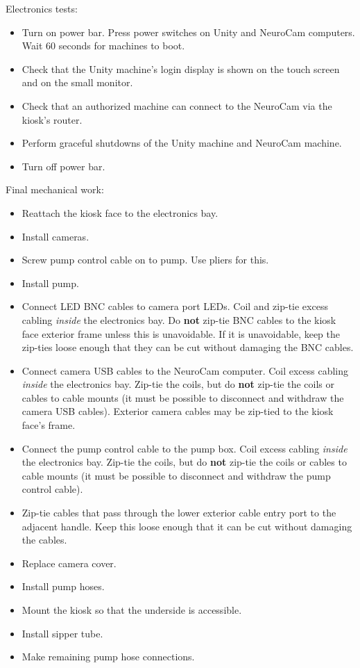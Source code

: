 Electronics tests:
\begin{itemize}
\item Turn on power bar. Press power switches on Unity and NeuroCam
computers. Wait 60 seconds for machines to boot.
\item Check that the Unity machine's login display is shown on the touch 
screen and on the small monitor.
\item Check that an authorized machine can connect to the NeuroCam via the
kiosk's router.
\item Perform graceful shutdowns of the Unity machine and NeuroCam machine.
\item Turn off power bar.
\end{itemize}

Final mechanical work:
\begin{itemize}
\item Reattach the kiosk face to the electronics bay.
\item Install cameras.
\item Screw pump control cable on to pump. Use pliers for this.
\item Install pump.
\item Connect LED BNC cables to camera port LEDs. Coil and zip-tie excess 
cabling \textit{inside} the electronics bay. Do \textbf{not} zip-tie BNC
cables to the kiosk face exterior frame unless this is unavoidable. If it
is unavoidable, keep the zip-ties loose enough that they can be cut without
damaging the BNC cables.
\item Connect camera USB cables to the NeuroCam computer. Coil excess
cabling \textit{inside} the electronics bay. Zip-tie the coils, but do
\textbf{not} zip-tie the coils or cables to cable mounts (it must be possible
to disconnect and withdraw the camera USB cables). Exterior camera cables
may be zip-tied to the kiosk face's frame.
\item Connect the pump control cable to the pump box. Coil excess cabling
\textit{inside} the electronics bay. Zip-tie the coils, but do \textbf{not}
zip-tie the coils or cables to cable mounts (it must be possible to
disconnect and withdraw the pump control cable).
\item Zip-tie cables that pass through the lower exterior cable entry port
to the adjacent handle. Keep this loose enough that it can be cut without
damaging the cables.
\item Replace camera cover.
\item Install pump hoses.
\item Mount the kiosk so that the underside is accessible.
\item Install sipper tube.
\item Make remaining pump hose connections.
\end{itemize}

